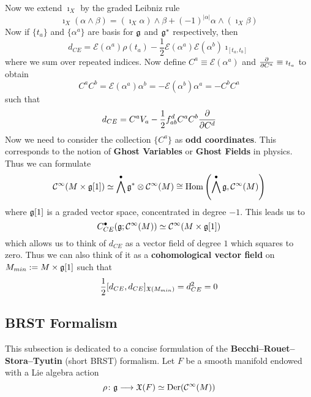 Now we extend $\imath_X$ by the graded Leibniz rule
\begin{equation}\imath_X(\alpha \wedge \beta) = (\imath_X \alpha) \wedge \beta + (-1)^{|\alpha|} \alpha \wedge (\imath_X \beta) \end{equation}
Now if $\{t_a\}$ and $\{\alpha^a\}$ are basis for $\mathfrak{g}$ and $\mathfrak{g}^*$ respectively, then
\begin{equation}
  d_{CE} = \mathcal{E}(\alpha^a) \rho(t_a) - \frac{1}{2} \mathcal{E}(\alpha^a) \mathcal{E}(\alpha^b) \imath_{[t_a, t_b]}
\end{equation}
where we sum over repeated indices. Now define $C^a \equiv \mathcal{E}(\alpha^a)$ and $\frac{\partial }{\partial C^a} \equiv \imath_{t_a}$ to obtain
\begin{equation}
  C^a C^b = \mathcal{E}(\alpha^a) \alpha^b = - \mathcal{E}(\alpha^b) \alpha^a = - C^b C^a
\end{equation}
such that
\begin{equation}
  d_{CE} = C^a V_a - \frac{1}{2} f_{ab}^d C^a C^b \frac{\partial }{\partial C^d}
\end{equation}
Now we need to consider the collection $\{C^a\}$ as \textbf{odd coordinates}. This corresponds to the notion of \textbf{Ghost Variables} or \textbf{Ghost Fields} in physics. Thus we can formulate
\begin{equation}
  \mathcal{C}^{\infty}(M \times \mathfrak{g}[1]) \simeq \bigwedge^\bullet \mathfrak{g}^* \otimes \mathcal{C}^{\infty}(M) \cong \operatorname{Hom}\left(\bigwedge^\bullet \mathfrak{g}, \mathcal{C}^{\infty}(M)\right)
\end{equation}
where $\mathfrak{g}[1]$ is a graded vector space, concentrated in degree $-1$. This leads us to
\begin{equation}
  C_{CE}^\bullet (\mathfrak{g} ; \mathcal{C}^{\infty}(M)) \simeq \mathcal{C}^{\infty}(M \times \mathfrak{g}[1])
\end{equation}
which allows us to think of $d_{CE}$ as a vector field of degree $1$ which squares to zero. Thus we can also think of it as a \textbf{cohomological vector field} on $M_{min}:=M \times \mathfrak{g}[1]$ such that
\begin{equation}
  \frac{1}{2} [d_{CE}, d_{CE}]_{\mathfrak{X}(M_{min})} = d_{CE}^2 = 0
\end{equation}

\subsection{BRST Formalism}

This subsection is dedicated to a concise formulation of the \textbf{Becchi--Rouet--Stora--Tyutin} (short BRST) formalism. Let $F$ be a smooth manifold endowed with a Lie algebra action
\begin{equation}
  \rho \colon \mathfrak{g} \longrightarrow \mathfrak{X}(F) \simeq \operatorname{Der}(\mathcal{C}^{\infty}(M))
\end{equation}

